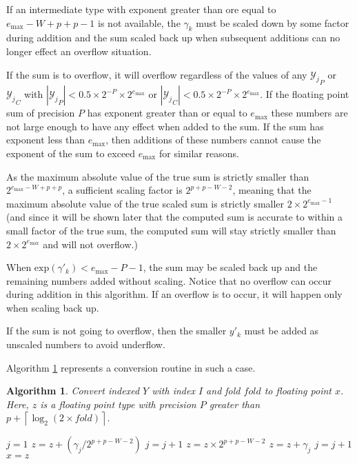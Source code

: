 \documentclass[12pt]{article}
\providecommand{\ceil}[1]{\left \lceil #1 \right \rceil }
\providecommand{\exp}{\ensuremath{\text{exp}}}
\providecommand{\max}{\ensuremath{\text{max}}}
\theoremstyle{plain}
\newtheorem{alg}{Algorithm}[section]
\numberwithin{equation}{section}
\begin{document}
    If an intermediate type with exponent greater than ore equal to $e_{\max} - W + p + p - 1$ is not available, the $\gamma_k$ must be scaled down by some factor during addition and the sum scaled back up when subsequent additions can no longer effect an overflow situation.

    If the sum is to overflow, it will overflow regardless of the values of any ${\mathcal{Y}_j}_P$ or ${\mathcal{Y}_j}_C$ with $|{\mathcal{Y}_j}_P| < 0.5 \times 2^{-P} \times 2^{e_{\max}}$ or $|{\mathcal{Y}_j}_C| < 0.5 \times 2^{-P} \times 2^{e_{\max}}$. If the floating point sum of precision $P$ has exponent greater than or equal to $e_{\max}$ these numbers are not large enough to have any effect when added to the sum. If the sum has exponent less than $e_{\max}$, then additions of these numbers cannot cause the exponent of the sum to exceed $e_{\max}$ for similar reasons.

    As the maximum absolute value of the true sum is strictly smaller than $2^{e_{\max} - W + p + p}$, a sufficient scaling factor is $2^{p + p - W - 2}$, meaning that the maximum absolute value of the true scaled sum is strictly smaller $2 \times 2^{e_{\max} - 1}$ (and since it will be shown later that the computed sum is accurate to within a small factor of the true sum, the computed sum will stay strictly smaller than $2 \times 2^{e_{\max}}$ and will not overflow.)

  When $\exp(\gamma'_k) < e_{\max} - P - 1$, the sum may be scaled back up and the remaining numbers added without scaling. Notice that no overflow can occur during addition in this algorithm. If an overflow is to occur, it will happen only when scaling back up.

    If the sum is not going to overflow, then the smaller $y'_k$ must be added as unscaled numbers to avoid underflow.

    Algorithm \ref{alg:conv2floatoverflow} represents a conversion routine in such a case.

    \begin{alg}
      Convert indexed $Y$ with index $I$ and fold $fold$ to floating point $x$. Here, $z$ is a floating point type with precision $P$ greater than $p + \ceil{\log_2(2 \times fold)}$.
      \begin{algorithmic}[1]
          \State $j = 1$
          \While{$j \leq 2 \times fold$ and $\exp(\gamma_j) \geq e_{\max} - P - 1$}
            \State $z = z + (\gamma_j / 2^{p + p - W - 2})$
            \State $j = j + 1$
          \EndWhile
          \State $z = z \times 2^{p + p - W - 2}$
            \State $z = z + \gamma_j$
            \State $j = j + 1$
          \EndWhile
          \State $x = z$
        \EndFunction
      \end{algorithmic}
      \label{alg:conv2floatoverflow}
    \end{alg}
\end{document}
